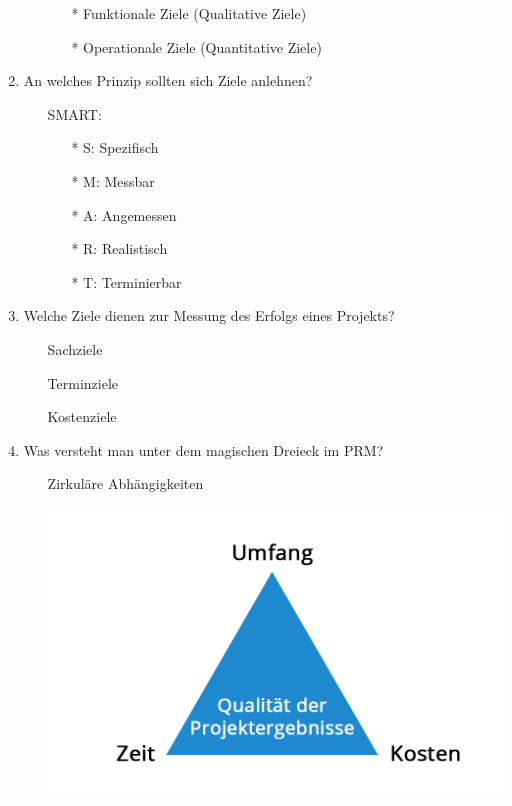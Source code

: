 \documentclass[12pt,a4paper]{article}
\begin{document}
\begin{enumerate}
\begin{enumerate}
		\begin{enumerate}
		\item[*] Funktionale Ziele (Qualitative Ziele)
		\item[*] Operationale Ziele (Quantitative Ziele)
		\end{enumerate}
	\end{enumerate}
\item An welches Prinzip sollten sich Ziele anlehnen?
	\begin{enumerate}
	\item[] SMART: 
		\begin{enumerate}
		\item[*] S: Spezifisch
		\item[*] M: Messbar
		\item[*] A: Angemessen
		\item[*] R: Realistisch
		\item[*] T: Terminierbar
		\end{enumerate}
	\end{enumerate}
\item Welche Ziele dienen zur Messung des Erfolgs eines Projekts?
	\begin{enumerate}
	\item[] Sachziele
	\item[] Terminziele
	\item[] Kostenziele
	\end{enumerate}
\item Was versteht man unter dem magischen Dreieck im PRM?
	\begin{enumerate}
	\item[] Zirkuläre Abhängigkeiten
	\item[] \includegraphics[scale=0.3]{Bilder/magischesDreieck.PNG}

\end{enumerate}
\end{enumerate}
\end{document}
